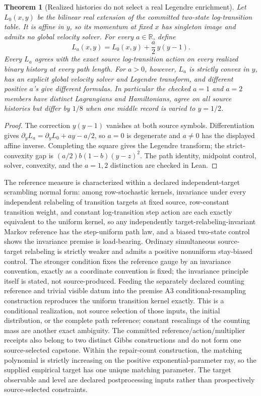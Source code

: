 \documentclass[11pt]{article}
\newtheorem{theorem}{Theorem}[section]
\begin{document}
\begin{theorem}[Realized histories do not select a real Legendre enrichment]
\label{thm:realized-history-legendre-nonidentifiability}
Let \(L_0(x,y)\) be the bilinear real extension of the committed two-state
log-transition table.  It is affine in \(y\), so its momentum at fixed \(x\)
has singleton image and admits no global velocity solver.  For every
\(a\in\mathbb R\), define
\[
 L_a(x,y)=L_0(x,y)+\frac a2\,y(y-1).
\]
Every \(L_a\) agrees with the exact source log-transition action on every
realized binary history at every path length.  For \(a>0\), however, \(L_a\)
is strictly convex in \(y\), has an explicit global velocity solver and
Legendre transform, and different positive \(a\)'s give different
formulas.  In particular the checked \(a=1\) and \(a=2\) members have distinct
Lagrangians and Hamiltonians, agree on all
source histories but differ by \(1/8\) when one middle record is varied to
\(y=1/2\).
\end{theorem}

\begin{proof}
The correction \(y(y-1)\) vanishes at both source symbols.  Differentiation
gives
\(\partial_yL_a=\partial_yL_0+a y-a/2\), so \(a=0\) is degenerate and
\(a\ne0\) has the displayed affine inverse.  Completing the square gives the
Legendre transform; the strict-convexity gap is
\((a/2)b(1-b)(y-z)^2\).  The path identity, midpoint control, solver,
convexity, and the \(a=1,2\) distinction are checked in Lean.
\end{proof}

The reference measure is characterized within a declared independent-target
scrambling normal form: among row-stochastic kernels, invariance under every
independent relabeling of transition targets at fixed source, row-constant transition weight, and constant
log-transition step action are each exactly equivalent to the uniform
kernel, so any independently target-relabeling-invariant Markov reference has the
step-uniform path law, and a biased two-state control shows the invariance
premise is load-bearing. Ordinary simultaneous source-target relabeling is
strictly weaker and admits a positive nonuniform stay-biased control. The
stronger condition fixes the reference gauge by an invariance
convention, exactly as a coordinate convention is fixed; the invariance
principle itself is stated, not source-produced.  Feeding the separately
declared counting reference and trivial visible datum into the premise A3
conditional-resampling construction reproduces the uniform transition
kernel exactly.  This is a conditional realization, not source selection of
those inputs, the initial distribution, or the complete path reference;
constant rescalings of the counting mass are another exact ambiguity.  The
committed reference/action/multiplier receipts also belong to two distinct
Gibbs constructions and do not form one source-selected capstone.  Within the
repair-count construction, the matching polynomial is strictly increasing on
the positive exponential-parameter ray, so the supplied empirical target has
one unique matching parameter.  The target observable and level are declared
postprocessing inputs rather than prospectively source-selected constraints.
\end{document}
